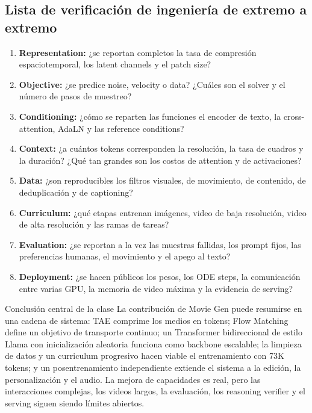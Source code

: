 \subsection{Lista de verificación de ingeniería de extremo a extremo}

\begin{enumerate}
  \item \textbf{Representation:} ¿se reportan completos la tasa de compresión espaciotemporal, los latent channels y el patch size?
  \item \textbf{Objective:} ¿se predice noise, velocity o data? ¿Cuáles son el solver y el número de pasos de muestreo?
  \item \textbf{Conditioning:} ¿cómo se reparten las funciones el encoder de texto, la cross-attention, AdaLN y las reference conditions?
  \item \textbf{Context:} ¿a cuántos tokens corresponden la resolución, la tasa de cuadros y la duración? ¿Qué tan grandes son los costos de attention y de activaciones?
  \item \textbf{Data:} ¿son reproducibles los filtros visuales, de movimiento, de contenido, de deduplicación y de captioning?
  \item \textbf{Curriculum:} ¿qué etapas entrenan imágenes, video de baja resolución, video de alta resolución y las ramas de tareas?
  \item \textbf{Evaluation:} ¿se reportan a la vez las muestras fallidas, los prompt fijos, las preferencias humanas, el movimiento y el apego al texto?
  \item \textbf{Deployment:} ¿se hacen públicos los pesos, los ODE steps, la comunicación entre varias GPU, la memoria de video máxima y la evidencia de serving?
\end{enumerate}

\begin{importantbox}{Conclusión central de la clase}
La contribución de Movie Gen puede resumirse en una cadena de sistema: TAE comprime los medios en tokens; Flow Matching define un objetivo de transporte continuo; un Transformer bidireccional de estilo Llama con inicialización aleatoria funciona como backbone escalable; la limpieza de datos y un curriculum progresivo hacen viable el entrenamiento con 73K tokens; y un posentrenamiento independiente extiende el sistema a la edición, la personalización y el audio. La mejora de capacidades es real, pero las interacciones complejas, los videos largos, la evaluación, los reasoning verifier y el serving siguen siendo límites abiertos.
\end{importantbox}
